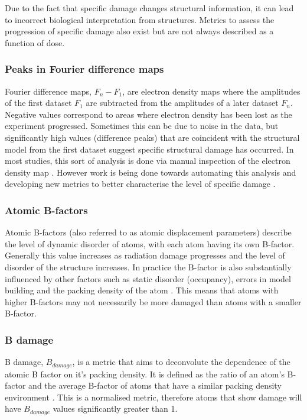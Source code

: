 		Due to the fact that specific damage changes structural information, it can lead to incorrect biological interpretation from structures.
		Metrics to assess the progression of specific damage also exist but are not always described as a function of dose.

        \subsubsection{Peaks in Fourier difference maps}
        \label{subs:Peaks in Fourier difference maps}
            Fourier difference maps, $F_n - F_1$, are electron density maps where the amplitudes of the first dataset $F_1$ are subtracted from the amplitudes of a later dataset $F_n$. 
			Negative values correspond to areas where electron density has been lost as the experiment progressed. 
			Sometimes this can be due to noise in the data, but significantly high values (difference peaks) that are coincident with the structural model from the first dataset suggest specific structural damage has occurred. 
			In most studies, this sort of analysis is done via manual inspection of the electron density map \cite{burmeister2000structural,weik2000,ravelli2000}. 
			However work is being done towards automating this analysis and developing new metrics to better characterise the level of specific damage \cite{bury2015radiation}.

        \subsubsection{Atomic B-factors}
        \label{subs:Atomic B-factors}
            Atomic B-factors (also referred to as atomic displacement parameters) describe the level of dynamic disorder of atoms, with each atom having its own B-factor. 
			Generally this value increases as radiation damage progresses and the level of disorder of the structure increases. 
			In practice the B-factor is also substantially influenced by other factors such as static disorder (occupancy), errors in model building and the packing density of the atom \cite{gerstel2015identifying}. 
			This means that atoms with higher B-factors may not necessarily be more damaged than atoms with a smaller B-factor.

        \subsubsection{B damage}
        \label{subs:B damage}
            B damage, $B_{damage}$, is a metric that aims to deconvolute the dependence of the atomic B factor on it's packing density. 
			It is defined as the ratio of an atom's B-factor and the average B-factor of atoms that have a similar packing density environment \cite{gerstel2015identifying}. 
			This is a normalised metric, therefore atoms that show damage will have $B_{damage}$ values significantly greater than 1.

